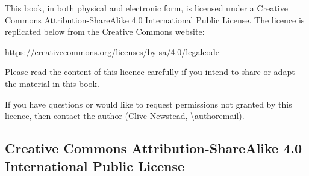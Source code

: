 This book, in both physical and electronic form, is licensed under a Creative Commons Attribution-ShareAlike 4.0 International Public License. The licence is replicated below from the Creative Commons website:
\begin{center}
\url{https://creativecommons.org/licenses/by-sa/4.0/legalcode}
\end{center}
Please read the content of this licence carefully if you intend to share or adapt the material in this book.

If you have questions or would like to request permissions not granted by this licence, then contact the author (Clive Newstead, \url{\authoremail}).

\subsection*{Creative Commons Attribution-ShareAlike 4.0 International Public License}

